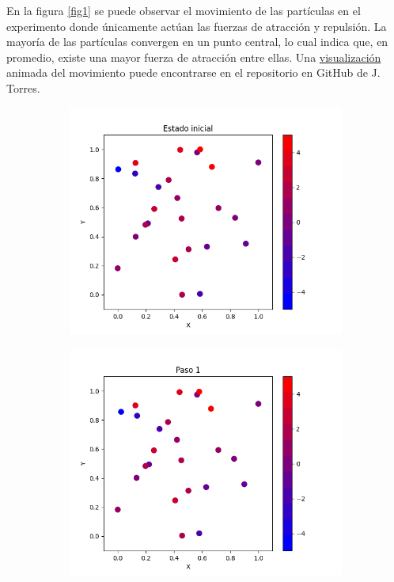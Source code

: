 \documentclass{report}
\begin{document}
En la figura \ref{fig1} se puede observar el movimiento de las part\'iculas en el experimento donde \'unicamente act\'uan las fuerzas de atracci\'on y repulsi\'on. La mayor\'ia de las part\'iculas convergen en un punto central, lo cual indica que, en promedio, existe una mayor fuerza de atracci\'on entre ellas. Una \href{https://github.com/FeroxDeitas/Simulacion-Nano/blob/main/Tareas/P9/Images/images_c/movement_c.gif}{visualizaci\'on} animada del movimiento puede encontrarse en el repositorio en GitHub de J. Torres.

\begin{figure}[h]
\centering
     \begin{subfigure}[b]{0.3\textwidth}
         \centering
         \includegraphics[width=\textwidth]{Images/Images_c/p9pc_t0.png}
     \end{subfigure}
     \begin{subfigure}[b]{0.3\textwidth}
         \centering
         \includegraphics[width=\textwidth]{Images/Images_c/p9pc_t01.png}

\end{subfigure}
\end{figure}
\end{document}
